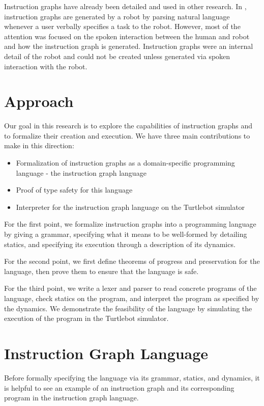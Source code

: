 \documentclass{sig-alternate-05-2015}
\begin{document}
Instruction graphs have already been detailed and used in other research. In
\cite{veloso:instructiongraphs}, instruction graphs are generated by a robot
by parsing natural language whenever a user verbally specifies a task to the
robot. However, most of the attention was focused on the spoken interaction
between the human and robot and how the instruction graph is generated.
Instruction graphs were an internal detail of the robot and could not be created
unless generated via spoken interaction with the robot.

\section{Approach}

Our goal in this research is to explore the capabilities of instruction graphs
and to formalize their creation and execution. We have three main contributions
to make in this direction:

\begin{itemize}
  \item Formalization of instruction graphs as a domain-specific programming
    language - the instruction graph language
  \item Proof of type safety for this language
  \item Interpreter for the instruction graph language on the Turtlebot
    simulator
\end{itemize}

For the first point, we formalize instruction graphs into a programming language
by giving a grammar, specifying what it means to be well-formed by detailing
statics, and specifying its execution through a description of its dynamics.

For the second point, we first define theorems of progress and preservation for
the language, then prove them to ensure that the language is safe.

For the third point, we write a lexer and parser to read concrete programs of
the language, check statics on the program, and interpret the program as
specified by the dynamics. We demonstrate the feasibility of the language by
simulating the execution of the program in the Turtlebot simulator.

\section{Instruction Graph Language}

Before formally specifying the language via its grammar, statics, and dynamics,
it is helpful to see an example of an instruction graph and its corresponding
program in the instruction graph language.
\end{document}
